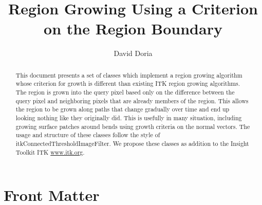 \documentclass{InsightArticle}
\title{Region Growing Using a Criterion on the Region Boundary}
\author{David Doria}
\newcommand{\IJhandlerIDnumber}{3119}
\begin{document}
%
% 
\IJhandlefooter{\IJhandlerIDnumber}


\ifpdf
\else
\fi


\maketitle


\ifhtml
\chapter*{Front Matter\label{front}}
\fi


\begin{abstract}
\noindent
This document presents a set of classes which implement a region growing algorithm whose criterion for growth is different than existing ITK region growing algorithms. The region is grown into the query pixel based only on the difference between the query pixel and neighboring pixels that are already members of the region. This allows the region to be grown along paths that change gradually over time and end up looking nothing like they originally did. This is usefully in many situation, including growing surface patches around bends using growth criteria on the normal vectors. The usage and structure of these classes follow the style of itkConnectedThresholdImageFilter. We propose these classes as addition to the Insight Toolkit ITK \url{www.itk.org}.


\end{abstract}

\IJhandlenote{\IJhandlerIDnumber}

\tableofcontents
\end{document}

